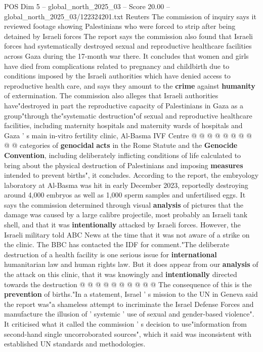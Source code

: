 \begin{textsample}{POS Dim 5 – global\_north\_2025\_03 – Score 20.00 – global\_north\_2025\_03/122324201.txt}
Reuters The commission of inquiry says it reviewed footage showing Palestinians who were forced to strip after being detained by Israeli forces The report says the commission also found that Israeli forces had systematically destroyed sexual and reproductive healthcare facilities across Gaza during the 17-month war there.
It concludes that women and girls have died from complications related to pregnancy and childbirth due to conditions imposed by the Israeli authorities which have denied access to reproductive health care, and says they amount to the \textbf{crime} against \textbf{humanity} of extermination.
The commission also alleges that Israeli authorities have"destroyed in part the reproductive capacity of Palestinians in Gaza as a group"through the"systematic destruction"of sexual and reproductive healthcare facilities, including maternity hospitals and maternity wards of hospitals and Gaza ' s main in-vitro fertility clinic, Al-Basma IVF Centre @ @ @ @ @ @ @ @ @ @ categories of \textbf{genocidal} \textbf{acts} in the Rome Statute and the \textbf{Genocide} \textbf{Convention}, including deliberately inflicting conditions of life calculated to bring about the physical destruction of Palestinians and imposing \textbf{measures} intended to prevent births", it concludes.
According to the report, the embryology laboratory at Al-Basma was hit in early December 2023, reportedly destroying around 4,000 embryos as well as 1,000 sperm samples and unfertilised eggs.
It says the commission determined through visual \textbf{analysis} of pictures that the damage was caused by a large calibre projectile, most probably an Israeli tank shell, and that it was \textbf{intentionally} attacked by Israeli forces.
However, the Israeli military told ABC News at the time that it was not aware of a strike on the clinic.
The BBC has contacted the IDF for comment."The deliberate destruction of a health facility is one serious issue for \textbf{international} humanitarian law and human rights law.
But it does appear from our \textbf{analysis} of the attack on this clinic, that it was knowingly and \textbf{intentionally} directed towards the destruction @ @ @ @ @ @ @ @ @ @ The consequence of this is the \textbf{prevention} of births."In a statement, Israel ' s mission to the UN in Geneva said the report was"a shameless attempt to incriminate the Israel Defense Forces and manufacture the illusion of ' systemic ' use of sexual and gender-based violence".
It criticised what it called the commission ' s decision to use"information from second-hand single uncorroborated sources", which it said was inconsistent with established UN standards and methodologies.

\end{textsample}
